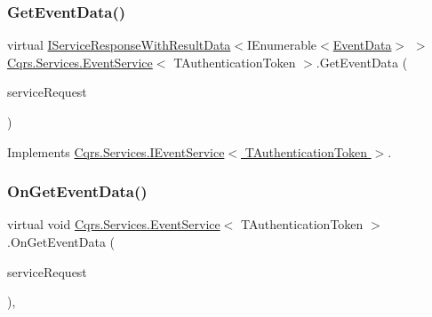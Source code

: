 \subsubsection{\texorpdfstring{Get\+Event\+Data()}{GetEventData()}}
{\footnotesize\ttfamily virtual \hyperlink{interfaceCqrs_1_1Services_1_1IServiceResponseWithResultData}{I\+Service\+Response\+With\+Result\+Data}$<$I\+Enumerable$<$\hyperlink{classCqrs_1_1Events_1_1EventData}{Event\+Data}$>$ $>$ \hyperlink{classCqrs_1_1Services_1_1EventService}{Cqrs.\+Services.\+Event\+Service}$<$ T\+Authentication\+Token $>$.Get\+Event\+Data (\begin{DoxyParamCaption}\item[{\hyperlink{interfaceCqrs_1_1Services_1_1IServiceRequestWithData}{I\+Service\+Request\+With\+Data}$<$ T\+Authentication\+Token, Guid $>$}]{service\+Request }\end{DoxyParamCaption})\hspace{0.3cm}{\ttfamily [virtual]}}



Implements \hyperlink{interfaceCqrs_1_1Services_1_1IEventService_aa41b82bc398bfab0b2fd519d7f067946}{Cqrs.\+Services.\+I\+Event\+Service$<$ T\+Authentication\+Token $>$}.

\mbox{\label{classCqrs_1_1Services_1_1EventService_a1556310c97fbf05df7804d53f91f8511}} 
\subsubsection{\texorpdfstring{On\+Get\+Event\+Data()}{OnGetEventData()}}
{\footnotesize\ttfamily virtual void \hyperlink{classCqrs_1_1Services_1_1EventService}{Cqrs.\+Services.\+Event\+Service}$<$ T\+Authentication\+Token $>$.On\+Get\+Event\+Data (\begin{DoxyParamCaption}\item[{\hyperlink{interfaceCqrs_1_1Services_1_1IServiceRequestWithData}{I\+Service\+Request\+With\+Data}$<$ T\+Authentication\+Token, Guid $>$}]{service\+Request }\end{DoxyParamCaption})\hspace{0.3cm}{\ttfamily [protected]}, {\ttfamily [virtual]}}

